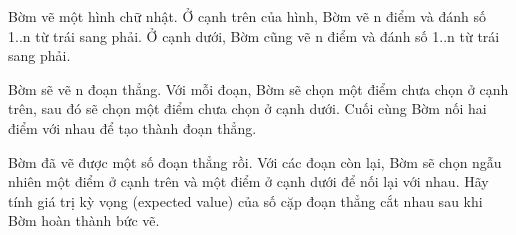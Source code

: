 Bờm vẽ một hình chữ nhật. Ở cạnh trên của hình, Bờm vẽ n điểm và đánh số 1..n từ trái sang phải. Ở cạnh dưới, Bờm cũng vẽ n điểm và đánh số 1..n từ trái sang phải.  

   Bờm sẽ vẽ n đoạn thẳng. Với mỗi đoạn, Bờm sẽ chọn một điểm chưa chọn ở cạnh trên, sau đó sẽ chọn một điểm chưa chọn ở cạnh dưới. Cuối cùng Bờm nối hai điểm với nhau để tạo thành đoạn thẳng.  

   Bờm đã vẽ được một số đoạn thẳng rồi. Với các đoạn còn lại, Bờm sẽ chọn ngẫu nhiên một điểm ở cạnh trên và một điểm ở cạnh dưới để nối lại với nhau. Hãy tính giá trị kỳ vọng (expected value) của số cặp đoạn thẳng cắt nhau sau khi Bờm hoàn thành bức vẽ.